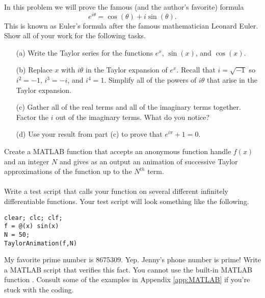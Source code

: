 \begin{problem}
    In this problem we will prove the famous (and the author's favorite) formula
    \[ e^{i\theta} = \cos(\theta) + i \sin(\theta). \]
    This is known as Euler's formula after the famous mathematician Leonard Euler.  Show
    all of your work for the following tasks.
    \begin{enumerate}
        \item[(a)] Write the Taylor series for the functions $e^x$, $\sin(x)$, and
            $\cos(x)$.
        \item[(b)] Replace $x$ with $i\theta$ in the Taylor expansion of $e^x$.  Recall
            that $i = \sqrt{-1}$ so $i^2 = -1$, $i^3 = -i$, and $i^4 = 1$.  Simplify all
            of the powers of $i\theta$ that arise in the Taylor expansion.
        \item[(c)] Gather all of the real terms and all of the imaginary terms together.
            Factor the $i$ out of the imaginary terms.  What do you notice?
        \item[(d)] Use your result from part (c) to prove that $e^{i\pi} + 1 =
            0$.
    \end{enumerate}
\end{problem}
\hint{
    \[ e^{i\theta} = 1 + (i\theta) + \frac{(i\theta)^2}{2} + \frac{(i\theta)^3}{3!} +
        \frac{(i\theta)^4}{4!} + \frac{(i\theta)^5}{5!} + \frac{(i\theta)^6}{6!} + \cdots
    \]
}

\begin{problem}
    Create a MATLAB function that accepts an anonymous function handle $f(x)$ and an
    integer $N$ and gives as an output an animation of successive Taylor approximations of
    the function up to the $N^{th}$ term.  \\
     \\
    Write a test script that calls your function on several different infinitely
    differentiable functions.  Your test script will look something like the following.
\begin{lstlisting}
clear; clc; clf;
f = @(x) sin(x)
N = 50;
TaylorAnimation(f,N)
\end{lstlisting}
\end{problem}

\begin{problem}
    My favorite prime number is 8675309.  Yep.  Jenny's phone number is prime!  Write a
    MATLAB script that verifies this fact.  You cannot use the built-in MATLAB function
    .
    Consult some of the examples in Appendix \ref{app:MATLAB} if you're stuck with
    the coding.
\end{problem}

